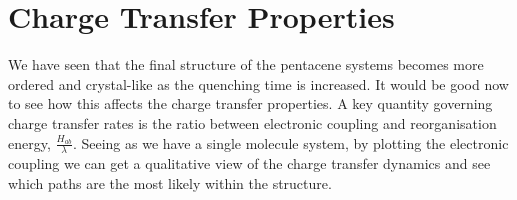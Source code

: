 \section{Charge Transfer Properties}
We have seen that the final structure of the pentacene systems becomes more ordered and crystal-like as the quenching time is increased. It would be good now to see how this affects the charge transfer properties. A key quantity governing charge transfer rates is the ratio between electronic coupling and reorganisation energy, $\frac{H_{ab}}{\lambda}$. Seeing as we have a single molecule system, by plotting the electronic coupling we can get a qualitative view of the charge transfer dynamics and see which paths are the most likely within the structure.
